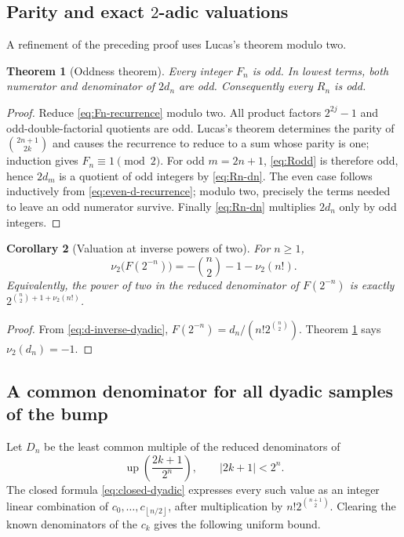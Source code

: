 \documentclass[11pt]{article}
\numberwithin{equation}{section}
\newtheorem{theorem}{Theorem}[section]
\newtheorem{corollary}[theorem]{Corollary}
\theoremstyle{definition}
\theoremstyle{remark}
\newcommand{\upf}{\operatorname{up}}
\newcommand{\floor}[1]{\left\lfloor#1\right\rfloor}
\begin{document}
\subsection{Parity and exact $2$-adic valuations}

A refinement of the preceding proof uses Lucas's theorem modulo two.

\begin{theorem}[Oddness theorem]\label{thm:oddness}
Every integer $F_n$ is odd.  In lowest terms, both numerator and denominator of $2d_n$ are odd.  Consequently every $R_n$ is odd.
\end{theorem}

\begin{proof}
Reduce \eqref{eq:Fn-recurrence} modulo two.  All product factors $2^{2j}-1$ and odd-double-factorial quotients are odd.  Lucas's theorem determines the parity of $\binom{2n+1}{2k}$ and causes the recurrence to reduce to a sum whose parity is one; induction gives $F_n\equiv1\pmod2$.  For odd $m=2n+1$, \eqref{eq:Rodd} is therefore odd, hence $2d_m$ is a quotient of odd integers by \eqref{eq:Rn-dn}.  The even case follows inductively from \eqref{eq:even-d-recurrence}; modulo two, precisely the terms needed to leave an odd numerator survive.  Finally \eqref{eq:Rn-dn} multiplies $2d_n$ only by odd integers.
\end{proof}

\begin{corollary}[Valuation at inverse powers of two]\label{cor:inverse-dyadic-valuation}
For $n\ge1$,
\begin{equation}\label{eq:inverse-dyadic-valuation}
 \nu_2\bigl(F(2^{-n})\bigr)
 =-\binom n2-1-\nu_2(n!).
\end{equation}
Equivalently, the power of two in the reduced denominator of $F(2^{-n})$ is exactly
$2^{\binom n2+1+\nu_2(n!)}$.
\end{corollary}

\begin{proof}
From \eqref{eq:d-inverse-dyadic},
$F(2^{-n})=d_n/(n!2^{\binom n2})$.  Theorem \ref{thm:oddness} says $\nu_2(d_n)=-1$.
\end{proof}

\subsection{A common denominator for all dyadic samples of the bump}

Let $D_n$ be the least common multiple of the reduced denominators of
\[
 \upf\!\left(\frac{2k+1}{2^n}\right),
 \qquad |2k+1|<2^n.
\]
The closed formula \eqref{eq:closed-dyadic} expresses every such value as an integer linear combination of $c_0,\ldots,c_{\floor{n/2}}$, after multiplication by $n!2^{\binom{n+1}{2}}$.  Clearing the known denominators of the $c_k$ gives the following uniform bound.
\end{document}
